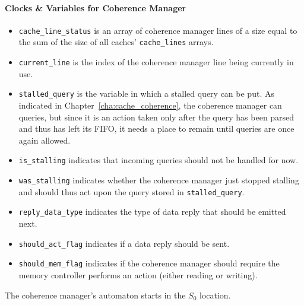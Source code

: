 \paragraph{Clocks \& Variables for Coherence Manager}
\begin{itemize}
\item
   \lstinline!cache_line_status! is an array of coherence manager lines of
   a size equal to the sum of the size of all caches' \lstinline!cache_lines!
   arrays.
\item
   \lstinline!current_line! is the index of the coherence manager line being
   currently in use.
\item
   \lstinline!stalled_query! is the variable in which a stalled query can be
   put. As indicated in Chapter~\ref{cha:cache_coherence}, the coherence manager
   can \stallact{} queries, but since it is an action taken only after the query
   has been parsed and thus has left its FIFO, it needs a place to remain until
   queries are once again allowed.
\item
   \lstinline!is_stalling! indicates that incoming queries should not be
   handled for now.
\item
   \lstinline!was_stalling! indicates whether the coherence manager just stopped
   stalling and should thus act upon the query stored in
   \lstinline!stalled_query!.
\item
   \lstinline!reply_data_type! indicates the type of data reply that should be
   emitted next.
\item
   \lstinline!should_act_flag! indicates if a data reply should be sent.
\item
   \lstinline!should_mem_flag! indicates if the coherence manager should require
   the memory controller performs an action (either reading or writing).
\end{itemize}

The coherence manager's automaton starts in the $S_0$ location.

